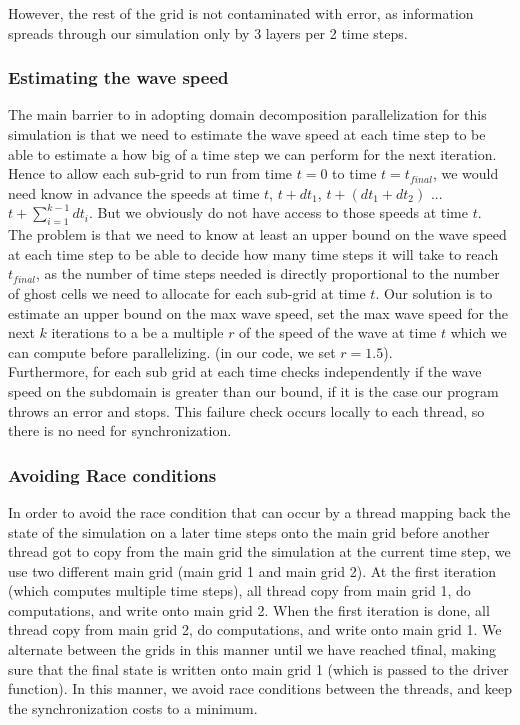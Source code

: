 \documentclass[11pt]{article}
\begin{document}
However, the rest of the grid is not contaminated with error, as information spreads through our simulation only by 3 layers per 2 time steps.

\subsubsection{Estimating the wave speed}
The main barrier to in adopting domain decomposition parallelization for this simulation is that we need to estimate the wave speed at each time step to be able to estimate a how big of a time step we can perform for the next iteration. Hence to allow each sub-grid to run from time $t=0$ to time $t=t_{final}$, we would need know in advance the speeds at time $t$, $t + dt_1$, $t + (dt_1+dt_2)$ ... $t+\sum_{i=1}^{k-1}dt_i$. But we obviously do not have access to those speeds at time $t$. \\

The problem is that we need to know at least an upper bound on the wave speed at each time step to be able to decide how many time steps it will take to reach $t_{final}$, as the number of time steps needed is directly proportional to the number of ghost cells we need to allocate for each sub-grid at time $t$. Our solution is to estimate an upper bound on the max wave speed, set the max wave speed for the next $k$ iterations to a be a multiple $r$ of the speed of the wave at time $t$ which we can compute before parallelizing. (in our code, we set $r=1.5$). \\

Furthermore, for each sub grid at each time checks independently if the wave speed on the subdomain is greater than our bound, if it is the case our program throws an error and stops. This failure check occurs locally to each thread, so there is no need for synchronization. 

\subsubsection{Avoiding Race conditions}
In order to avoid the race condition that can occur by a thread mapping back the state of the simulation on a later time steps onto the main grid before another thread got to copy from the main grid the simulation at the current time step, we use two different main grid (main grid 1 and main grid 2). At the first iteration (which computes multiple time steps), all thread copy from main grid 1, do computations, and write onto main grid 2. When the first iteration is done, all thread copy from main grid 2, do computations, and write onto main grid 1. We alternate between the grids in this manner until we have reached tfinal, making sure that the final state is written onto main grid 1 (which is passed to the driver function). In this manner, we avoid race conditions between the threads, and keep the synchronization costs to a minimum.
\end{document}
